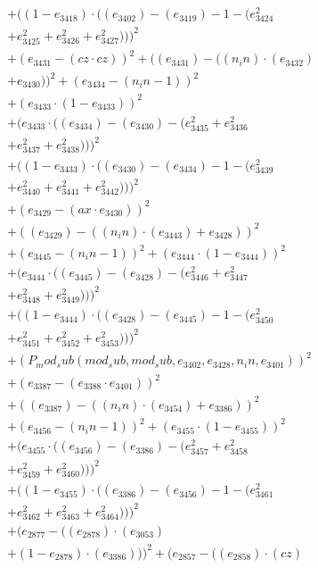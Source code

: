 \documentclass[10pt, a4paper]{article}
\begin{document}
\begin{align*}
& + ((1 - e_{3418})  \cdot  ((e_{3402}) - (e_{3419}) - 1 - (e_{3424}^{2} \\
& + e_{3425}^{2} + e_{3426}^{2} + e_{3427}^{2})))^{2} \\
& + (e_{3431} - (cz  \cdot  cz))^{2} + ((e_{3431}) - ((n_in)  \cdot  (e_{3432}) \\
& + e_{3430}))^{2} + (e_{3434} - (n_in - 1))^{2} \\
& + (e_{3433}  \cdot  (1 - e_{3433}))^{2} \\
& + (e_{3433}  \cdot  ((e_{3434}) - (e_{3430}) - (e_{3435}^{2} + e_{3436}^{2} \\
& + e_{3437}^{2} + e_{3438}^{2})))^{2} \\
& + ((1 - e_{3433})  \cdot  ((e_{3430}) - (e_{3434}) - 1 - (e_{3439}^{2} \\
& + e_{3440}^{2} + e_{3441}^{2} + e_{3442}^{2})))^{2} \\
& + (e_{3429} - (ax  \cdot  e_{3430}))^{2} \\
& + ((e_{3429}) - ((n_in)  \cdot  (e_{3443}) + e_{3428}))^{2} \\
& + (e_{3445} - (n_in - 1))^{2} + (e_{3444}  \cdot  (1 - e_{3444}))^{2} \\
& + (e_{3444}  \cdot  ((e_{3445}) - (e_{3428}) - (e_{3446}^{2} + e_{3447}^{2} \\
& + e_{3448}^{2} + e_{3449}^{2})))^{2} \\
& + ((1 - e_{3444})  \cdot  ((e_{3428}) - (e_{3445}) - 1 - (e_{3450}^{2} \\
& + e_{3451}^{2} + e_{3452}^{2} + e_{3453}^{2})))^{2} \\
& + (P_mod_sub(mod_sub, mod_sub, e_{3402}, e_{3428}, n_in, e_{3401}))^{2} \\
& + (e_{3387} - (e_{3388}  \cdot  e_{3401}))^{2} \\
& + ((e_{3387}) - ((n_in)  \cdot  (e_{3454}) + e_{3386}))^{2} \\
& + (e_{3456} - (n_in - 1))^{2} + (e_{3455}  \cdot  (1 - e_{3455}))^{2} \\
& + (e_{3455}  \cdot  ((e_{3456}) - (e_{3386}) - (e_{3457}^{2} + e_{3458}^{2} \\
& + e_{3459}^{2} + e_{3460}^{2})))^{2} \\
& + ((1 - e_{3455})  \cdot  ((e_{3386}) - (e_{3456}) - 1 - (e_{3461}^{2} \\
& + e_{3462}^{2} + e_{3463}^{2} + e_{3464}^{2})))^{2} \\
& + (e_{2877} - ((e_{2878})  \cdot  (e_{3053}) \\
& + (1 - e_{2878})  \cdot  (e_{3386})))^{2} + (e_{2857} - ((e_{2858})  \cdot  (cz) \\

\end{align*}
\end{document}
